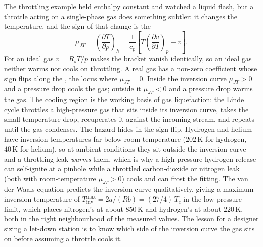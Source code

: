 \begin{mastery}
The throttling example held enthalpy constant and watched a liquid flash,
but a throttle acting on a single-phase gas does something subtler: it
changes the temperature, and the sign of that change is the
\[
\mu_{JT} = \left(\frac{\partial T}{\partial p}\right)_h
= \frac{1}{c_p}\left[T\left(\frac{\partial v}{\partial T}\right)_p -
v\right].
\]
For an ideal gas $v = R_s T/p$ makes the bracket vanish identically, so
an ideal gas neither warms nor cools on throttling. A real gas has a
non-zero coefficient whose sign flips along the , the locus where $\mu_{JT} = 0$. Inside the inversion curve
$\mu_{JT} > 0$ and a pressure drop cools the gas; outside it $\mu_{JT} <
0$ and a pressure drop warms the gas. The cooling region is the working
basis of gas liquefaction: the Linde cycle throttles a high-pressure gas
that sits inside its inversion curve, takes the small temperature drop,
recuperates it against the incoming stream, and repeats until the gas
condenses. The hazard hides in the sign flip. Hydrogen and helium have
inversion temperatures far below room temperature ($202\,\si{\kelvin}$
for hydrogen, $40\,\si{\kelvin}$ for helium), so at ambient conditions
they sit outside the inversion curve and a throttling leak \emph{warms}
them, which is why a high-pressure hydrogen release can self-ignite at a
pinhole while a throttled carbon-dioxide or nitrogen leak (both with
room-temperature $\mu_{JT} > 0$) cools and can frost the fitting. The van
der Waals equation predicts the inversion curve qualitatively, giving a
maximum inversion temperature of $T_{\text{inv}}^{\max} = 2a/(R b) =
(27/4)\,T_c$ in the low-pressure limit, which places nitrogen's at about
$850\,\si{\kelvin}$ and hydrogen's at about $220\,\si{\kelvin}$, both in
the right neighbourhood of the measured values. The lesson for a designer
sizing a let-down station is to know which side of the inversion curve
the gas sits on before assuming a throttle cools it.
\end{mastery}

